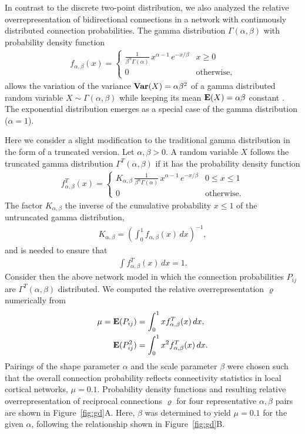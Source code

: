 
In contrast to the discrete two-point distribution, we also analyzed
the relative overrepresentation of bidirectional connections in a
network with continuously distributed connection probabilities. The
gamma distribution $\Gamma(\alpha, \beta)$ with probability density
function
\begin{align}
    f_{\alpha,\beta}(x) = \begin{cases} 
\frac{1}{\beta^{\alpha}\Gamma(\alpha)}\, x^{\alpha-1}\,e^{-x/\beta} & x \geq 0 \\
0 & \text{otherwise},
\end{cases}
\end{align}
allows the variation of the variance $\operatorname{\mathbf{Var}}(X)= \alpha \beta^2 $ of a
gamma distributed random variable $X \sim \Gamma(\alpha, \beta)$ while
keeping its mean $\operatorname{\mathbf{E}}(X) = \alpha \beta $ constant \cite{Hogg1978}.
The exponential distribution emerges as a special case of the gamma
distribution ($\alpha =1$).

Here we consider a slight modification to the traditional gamma
distribution in the form of a truncated version. Let $\alpha, \beta >
0$. A random variable $X$ follows the truncated gamma distribution
$\Gamma^T(\alpha, \beta)$ if it has the probability density function
%
\begin{align}
  f_{\alpha,\beta}^T(x) = \begin{cases} K_{\alpha, \beta}\,
\frac{1}{\beta^{\alpha}\Gamma(\alpha)}\, x^{\alpha-1}\,e^{-x/\beta} & 0 \leq x \leq 1 \\
0 & \text{otherwise}.
\end{cases}
\end{align}
%
The factor $K_{\alpha,\beta}$  the inverse of the cumulative
probability $x \leq 1$ of the untruncated gamma distribution,
\begin{align}
  K_{\alpha,\beta} = \left(\int_0^{1} f_{\alpha,\beta}(x) \, dx \right)^{-1},
\end{align}
and is needed to ensure that
\begin{align}
  \int f_{\alpha,\beta}^T(x) \,dx = 1 \label{eq:gd1}.
\end{align}
Consider then the above network model in which the connection
probabilities $P_{ij}$ are $\Gamma^T(\alpha, \beta)$ distributed. We
computed the relative overrepresentation $\varrho$ numerically from
\begin{align}
  \mu = \operatorname{\mathbf{E}}(P_{ij}) &= \int_0^1 x f_{\alpha,\beta}^T(x)\, dx,\\
        \operatorname{\mathbf{E}}(P_{ij}^2) &= \int_0^1 x^2 f_{\alpha,\beta}^T(x)\, dx.
\end{align}
%
Pairings of the shape parameter $\alpha$ and the scale parameter
$\beta$ were chosen such that the overall connection probability
reflects connectivity statistics in local cortical networks, $\mu =
0.1$. Probability density functions and resulting relative
overrepresentation of reciprocal connections $\varrho$ for four
representative $\alpha,\beta$ pairs are shown in
Figure~\ref{fig:gd}A. Here, $\beta$ was determined to yield $\mu =
0.1$ for the given $\alpha$, following the relationship shown in
Figure~\ref{fig:gd}B.

